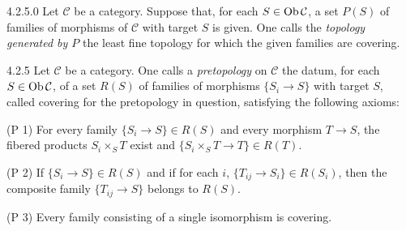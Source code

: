 \begin{definition}{4.2.5.0}\label{IV.4.2.5.0}
Let \(\mathcal C\) be a category. Suppose that, for each \(S\in\operatorname{Ob}\mathcal C\),
a set \(P(S)\) of families of morphisms of \(\mathcal C\) with target \(S\)
is given. One calls the \emph{topology generated by \(P\)} the least fine
topology for which the given families are covering.
\end{definition}

\begin{definition}{4.2.5}\label{IV.4.2.5}
Let \(\mathcal C\) be a category. One calls a \emph{pretopology} on \(\mathcal C\)
the datum, for each \(S\in\operatorname{Ob}\mathcal C\), of a set \(R(S)\) of families
of morphisms \(\{S_i\to S\}\) with target \(S\), called covering for the
pretopology in question, satisfying the following axioms:

(P 1) For every family \(\{S_i\to S\}\in R(S)\) and every morphism \(T\to S\),
the fibered products \(S_i\times_S T\) exist and
\(\{S_i\times_S T\to T\}\in R(T)\).

(P 2) If \(\{S_i\to S\}\in R(S)\) and if for each \(i\),
\(\{T_{ij}\to S_i\}\in R(S_i)\), then the composite family
\(\{T_{ij}\to S\}\) belongs to \(R(S)\).

(P 3) Every family consisting of a single isomorphism is covering.
\end{definition}

